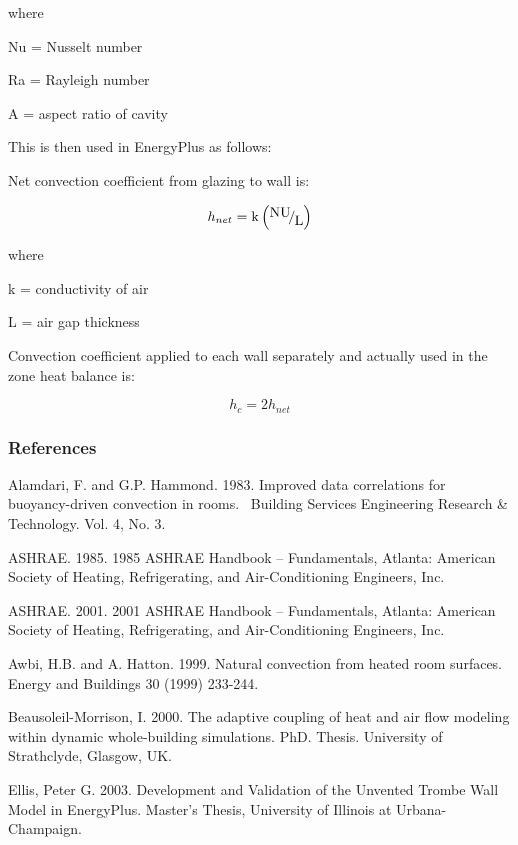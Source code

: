 where

Nu = Nusselt number

Ra = Rayleigh number

A = aspect ratio of cavity

This is then used in EnergyPlus as follows:

Net convection coefficient from glazing to wall is:

\begin{equation}
{h_{net}} = {\rm{k}}\left( {{\raise0.7ex\hbox{{{\rm{NU}}}} \!\mathord{\left/ {\vphantom {{{\rm{NU}}} {\rm{L}}}}\right.}\!\lower0.7ex\hbox{{\rm{L}}}}} \right)
\end{equation}

where

k = conductivity of air

L = air gap thickness

Convection coefficient applied to each wall separately and actually used in the zone heat balance is:

\begin{equation}
{h_c} = 2{h_{net}}
\end{equation}

\subsubsection{References}\label{references-032}

Alamdari, F. and G.P. Hammond. 1983. Improved data correlations for buoyancy-driven convection in rooms.~ Building Services Engineering Research \& Technology. Vol. 4, No. 3.

ASHRAE. 1985. 1985 ASHRAE Handbook -- Fundamentals, Atlanta: American Society of Heating, Refrigerating, and Air-Conditioning Engineers, Inc.

ASHRAE. 2001. 2001 ASHRAE Handbook -- Fundamentals, Atlanta: American Society of Heating, Refrigerating, and Air-Conditioning Engineers, Inc.

Awbi, H.B. and A. Hatton. 1999. Natural convection from heated room surfaces. Energy and Buildings 30 (1999) 233-244.

Beausoleil-Morrison, I. 2000. The adaptive coupling of heat and air flow modeling within dynamic whole-building simulations. PhD. Thesis. University of Strathclyde, Glasgow, UK.

Ellis, Peter G. 2003. Development and Validation of the Unvented Trombe Wall Model in EnergyPlus. Master's Thesis, University of Illinois at Urbana-Champaign.

